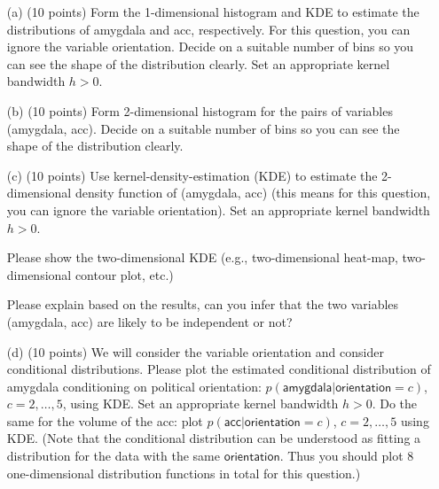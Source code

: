 \documentclass[12pt]{article}
\begin{document}
 \begin{enumerate}
 
 
 \item[(a)] (10 points) Form the 1-dimensional histogram and KDE to estimate the distributions of \textsf{amygdala} and \textsf{acc}, respectively. For this question, you can ignore the variable \textsf{orientation}. Decide on a suitable number of bins so you can see the shape of the distribution clearly. Set an appropriate kernel bandwidth $h >0$. 
 
 
 
 \item[(b)] (10 points) Form 2-dimensional histogram for the pairs of variables (\textsf{amygdala}, \textsf{acc}). Decide on a suitable number of bins so you can see the shape of the distribution clearly. 
 
 \item[(c)] (10 points) Use kernel-density-estimation (KDE) to estimate the 2-dimensional density function of (\textsf{amygdala}, \textsf{acc}) (this means for this question, you can ignore the variable \textsf{orientation}). Set an appropriate kernel bandwidth $h >0$. 

Please show the two-dimensional KDE (e.g., two-dimensional heat-map, two-dimensional contour plot, etc.)

Please explain based on the results, can you infer that the two variables (\textsf{amygdala}, \textsf{acc}) are likely to be independent or not?


 \item[(d)] (10 points) We will consider the variable \textsf{orientation} and consider conditional distributions. Please plot the estimated conditional distribution of \textsf{amygdala} conditioning on political \textsf{orientation}: $p(\textsf{amygdala}|\textsf{orientation}=c)$, $c = 2, \ldots, 5$, using KDE. Set an appropriate kernel bandwidth $h >0$.  Do the same for the volume of the \textsf{acc}: plot $p(\textsf{acc}|\textsf{orientation}=c)$, $c = 2, \ldots, 5$ using KDE. (Note that the conditional distribution can be understood as fitting a distribution for the data with the same $\textsf{orientation}$. Thus you should plot 8 one-dimensional distribution functions in total for this question.) 
 

\end{enumerate}
\end{document}
